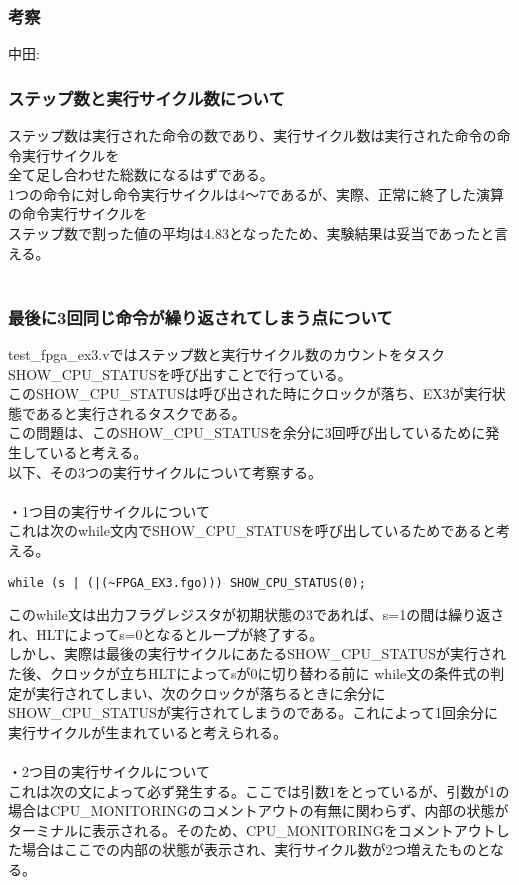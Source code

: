 \documentclass{jsarticle}
\begin{document}
\subsubsection*{考察}
中田: \\

\subsubsection*{ステップ数と実行サイクル数について}
ステップ数は実行された命令の数であり、実行サイクル数は実行された命令の命令実行サイクルを \\
全て足し合わせた総数になるはずである。 \\
1つの命令に対し命令実行サイクルは4～7であるが、実際、正常に終了した演算の命令実行サイクルを \\
ステップ数で割った値の平均は4.83となったため、実験結果は妥当であったと言える。 \\
\\
\subsubsection*{最後に3回同じ命令が繰り返されてしまう点について}
test\_fpga\_ex3.vではステップ数と実行サイクル数のカウントをタスクSHOW\_CPU\_STATUSを呼び出すことで行っている。 \\
このSHOW\_CPU\_STATUSは呼び出された時にクロックが落ち、EX3が実行状態であると実行されるタスクである。 \\
この問題は、このSHOW\_CPU\_STATUSを余分に3回呼び出しているために発生していると考える。 \\
以下、その3つの実行サイクルについて考察する。 \\
\\
・1つ目の実行サイクルについて \\
これは次のwhile文内でSHOW\_CPU\_STATUSを呼び出しているためであると考える。 \\

\begin{lstlisting}[caption=test\_fpga\_ex3.v 264行目]
while (s | (|(~FPGA_EX3.fgo))) SHOW_CPU_STATUS(0);
\end{lstlisting}

このwhile文は出力フラグレジスタが初期状態の3であれば、s=1の間は繰り返され、HLTによってs=0となるとループが終了する。 \\
しかし、実際は最後の実行サイクルにあたるSHOW\_CPU\_STATUSが実行された後、クロックが立ちHLTによってsが0に切り替わる前に
while文の条件式の判定が実行されてしまい、次のクロックが落ちるときに余分にSHOW\_CPU\_STATUSが実行されてしまうのである。これによって1回余分に実行サイクルが生まれていると考えられる。 \\
\\
・2つ目の実行サイクルについて \\
これは次の文によって必ず発生する。ここでは引数1をとっているが、引数が1の場合はCPU\_MONITORINGのコメントアウトの有無に関わらず、内部の状態がターミナルに表示される。そのため、CPU\_MONITORINGをコメントアウトした場合はここでの内部の状態が表示され、実行サイクル数が2つ増えたものとなる。
\end{document}
